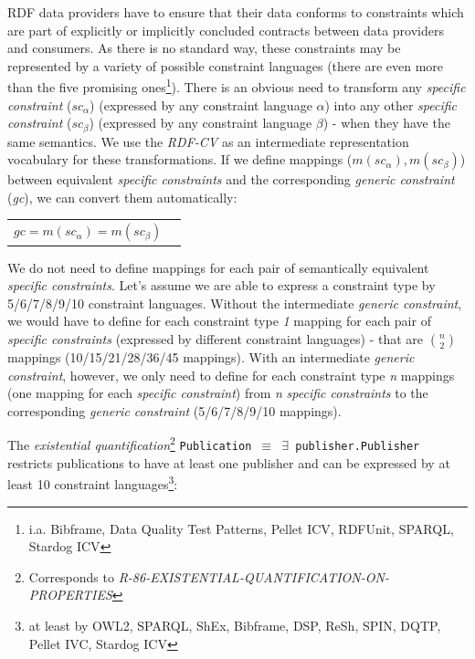 \documentclass{llncs}
\newcommand{\ms}[1]{\texttt{#1}}
\newenvironment{DL}{
  \vspace{0cm}
	\begin{center}
  \begin{tabular}{r l}

}{
  \end{tabular}
	\end{center}
}
\begin{document}
RDF data providers have to ensure that their data conforms to constraints which are part of explicitly or implicitly concluded contracts between data providers and consumers.
As there is no standard way, these constraints may be represented by a variety of possible constraint languages (there are even more than the five promising ones\footnote{i.a. Bibframe, Data Quality Test Patterns, Pellet ICV, RDFUnit, SPARQL, Stardog ICV}).
There is an obvious need to transform any \emph{specific constraint} (\emph{$sc_{\alpha}$}) (expressed by any constraint language \emph{$\alpha$}) into any other \emph{specific constraint} (\emph{$sc_{\beta}$}) (expressed by any constraint language \emph{$\beta$}) - when they have the same semantics.
We use the \emph{RDF-CV} as an intermediate representation vocabulary for these transformations.
If we define mappings ($m(sc_{\alpha}), m(sc_{\beta})$) between equivalent \emph{specific constraints} and the corresponding \emph{generic constraint} (\emph{gc}),
we can convert them automatically:

\begin{DL}
$ gc = m(sc_{\alpha}) = m(sc_{\beta}) $
\end{DL}

We do not need to define mappings for each pair of semantically equivalent \emph{specific constraints}.
Let's assume we are able to express a constraint type by 5/6/7/8/9/10 constraint languages.
Without the intermediate \emph{generic constraint}, we would have to define for each constraint type \emph{1} mapping for each pair of \emph{specific constraints} (expressed by different constraint languages)
- that are \emph{\( {n \choose 2} \)} mappings (10/15/21/28/36/45 mappings).
With an intermediate \emph{generic constraint}, however, we only need to define for each constraint type \emph{n} mappings (one mapping for each \emph{specific constraint}) from \emph{n} \emph{specific constraints} to the corresponding \emph{generic constraint} (5/6/7/8/9/10 mappings).



The {\em existential quantification}\footnote{Corresponds to {\em R-86-EXISTENTIAL-QUANTIFICATION-ON-PROPERTIES}}
\ms{Publication $\equiv$ $\exists$ publisher.Publisher} restricts publications to have at least one publisher and can be expressed by at least 10 constraint languages\footnote{at least by OWL2, SPARQL, ShEx, Bibframe, DSP, ReSh, SPIN, DQTP, Pellet IVC, Stardog ICV}:
\end{document}
